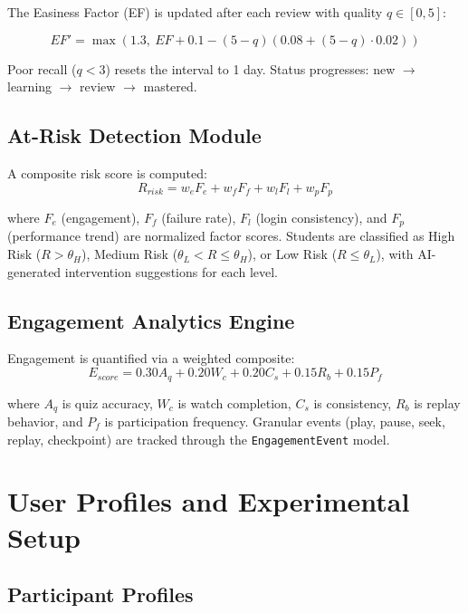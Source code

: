 \documentclass[conference]{IEEEtran}
\begin{document}
The Easiness Factor (EF) is updated after each review with quality $q \in [0,5]$:

\begin{equation}
EF' = \max(1.3,\ EF + 0.1 - (5-q)(0.08 + (5-q) \cdot 0.02))
\end{equation}

Poor recall ($q < 3$) resets the interval to 1 day. Status progresses: new $\rightarrow$ learning $\rightarrow$ review $\rightarrow$ mastered.

\subsection{At-Risk Detection Module}

A composite risk score is computed:
\begin{equation}
R_{risk} = w_e F_e + w_f F_f + w_l F_l + w_p F_p
\end{equation}

where $F_e$ (engagement), $F_f$ (failure rate), $F_l$ (login consistency), and $F_p$ (performance trend) are normalized factor scores. Students are classified as High Risk ($R > \theta_H$), Medium Risk ($\theta_L < R \leq \theta_H$), or Low Risk ($R \leq \theta_L$), with AI-generated intervention suggestions for each level.

\subsection{Engagement Analytics Engine}

Engagement is quantified via a weighted composite:
\begin{equation}
E_{score} = 0.30 A_q + 0.20 W_c + 0.20 C_s + 0.15 R_b + 0.15 P_f
\end{equation}

where $A_q$ is quiz accuracy, $W_c$ is watch completion, $C_s$ is consistency, $R_b$ is replay behavior, and $P_f$ is participation frequency. Granular events (play, pause, seek, replay, checkpoint) are tracked through the \texttt{EngagementEvent} model.

\section{User Profiles and Experimental Setup}

\subsection{Participant Profiles}
\end{document}
